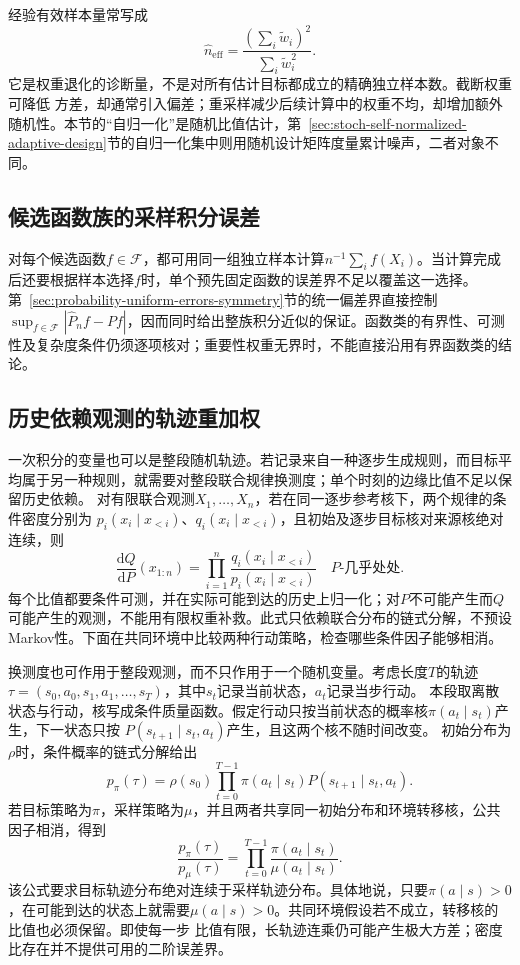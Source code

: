 经验有效样本量常写成
\[ \widehat{n}_{\mathrm{eff}}
  =\frac{(\sum_i\widetilde{w}_i)^2}{\sum_i\widetilde{w}_i^2}. \]
它是权重退化的诊断量，不是对所有估计目标都成立的精确独立样本数。截断权重可降低
方差，却通常引入偏差；重采样减少后续计算中的权重不均，却增加额外随机性。本节的“自归一化”是随机比值估计，第~\ref{sec:stoch-self-normalized-adaptive-design}节的自归一化集中则用随机设计矩阵度量累计噪声，二者对象不同。

\subsection{候选函数族的采样积分误差}
对每个候选函数\(f\in\mathcal F\)，都可用同一组独立样本计算\(n^{-1}\sum_i f(X_i)\)。当计算完成后还要根据样本选择\(f\)时，单个预先固定函数的误差界不足以覆盖这一选择。第~\ref{sec:probability-uniform-errors-symmetry}节的统一偏差界直接控制\(\sup_{f\in\mathcal F}|\widehat P_n f-Pf|\)，因而同时给出整族积分近似的保证。函数类的有界性、可测性及复杂度条件仍须逐项核对；重要性权重无界时，不能直接沿用有界函数类的结论。

\subsection{历史依赖观测的轨迹重加权}
\label{sec:stoch-trajectory-reweighting}
一次积分的变量也可以是整段随机轨迹。若记录来自一种逐步生成规则，而目标平均属于另一种规则，就需要对整段联合规律换测度；单个时刻的边缘比值不足以保留历史依赖。
对有限联合观测\(X_1,\ldots,X_n\)，若在同一逐步参考核下，两个规律的条件密度分别为
\(p_i(x_i\mid x_{<i})\)、\(q_i(x_i\mid x_{<i})\)，且初始及逐步目标核对来源核绝对连续，则
\[
\frac{\mathrm dQ}{\mathrm dP}(x_{1:n})
=\prod_{i=1}^n
\frac{q_i(x_i\mid x_{<i})}{p_i(x_i\mid x_{<i})}
\quad P\text{-几乎处处}.
\]
每个比值都要条件可测，并在实际可能到达的历史上归一化；对\(P\)不可能产生而\(Q\)可能产生的观测，不能用有限权重补救。此式只依赖联合分布的链式分解，不预设Markov性。下面在共同环境中比较两种行动策略，检查哪些条件因子能够相消。

换测度也可作用于整段观测，而不只作用于一个随机变量。考虑长度\(T\)的轨迹
\(\tau=(s_0,a_0,s_1,a_1,\ldots,s_T)\)，其中\(s_t\)记录当前状态，\(a_t\)记录当步行动。
本段取离散状态与行动，核写成条件质量函数。假定行动只按当前状态的概率核\(\pi(a_t\mid s_t)\)产生，下一状态只按
\(P(s_{t+1}\mid s_t,a_t)\)产生，且这两个核不随时间改变。
初始分布为\(\rho\)时，条件概率的链式分解给出
\[ p_\pi(\tau)
  =\rho(s_0)\prod_{t=0}^{T-1}\pi(a_t\mid s_t)P(s_{t+1}\mid s_t,a_t). \]
若目标策略为\(\pi\)，采样策略为\(\mu\)，并且两者共享同一初始分布和环境转移核，公共因子相消，得到
\begin{equation}
  \frac{p_\pi(\tau)}{p_\mu(\tau)}
  =
  \prod_{t=0}^{T-1}
  \frac{\pi(a_t\mid s_t)}{\mu(a_t\mid s_t)}.
  \label{eq:probability-trajectory-likelihood-ratio}
\end{equation}
该公式要求目标轨迹分布绝对连续于采样轨迹分布。具体地说，只要\(\pi(a\mid s)>0\)，在可能到达的状态上就需要\(\mu(a\mid s)>0\)。共同环境假设若不成立，转移核的比值也必须保留。即使每一步
比值有限，长轨迹连乘仍可能产生极大方差；密度比存在并不提供可用的二阶误差界。

